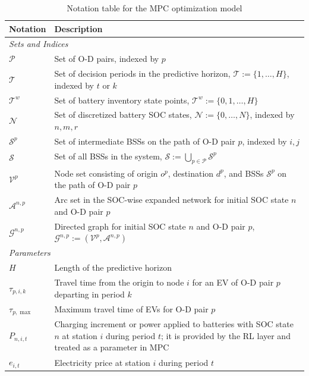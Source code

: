 \documentclass[12pt,hyperref,a4paper,UTF8]{ctexart}
\begin{document}
\begin{table}[!htbp]
  \centering
  \caption{Notation table for the MPC optimization model}
  \label{tab:notation}
  \footnotesize
  \setlength{\tabcolsep}{2pt}
  \renewcommand{\arraystretch}{0.88}
  \begin{tabular}{@{}lp{13cm}@{}}
    \toprule
    \textbf{Notation} & \textbf{Description} \\
    \midrule
    \multicolumn{2}{l}{\textit{Sets and Indices}} \\
    $\mathcal{P}$ & Set of O-D pairs, indexed by $p$ \\
    $\mathcal{T}$ & Set of decision periods in the predictive horizon, $\mathcal{T}:=\{1,\dots,H\}$, indexed by $t$ or $k$ \\
    $\mathcal{T}^{w}$ & Set of battery inventory state points, $\mathcal{T}^{w}:=\{0,1,\dots,H\}$ \\
    $\mathcal{N}$ & Set of discretized battery SOC states, $\mathcal{N}:=\{0,\dots,N\}$, indexed by $n,m,r$ \\
    $\mathcal{S}^{p}$ & Set of intermediate BSSs on the path of O-D pair $p$, indexed by $i,j$ \\
    $\mathcal{S}$ & Set of all BSSs in the system, $\mathcal{S}:=\bigcup_{p\in\mathcal{P}}\mathcal{S}^{p}$ \\
    $\mathcal{V}^{p}$ & Node set consisting of origin $o^{p}$, destination $d^{p}$, and BSSs $\mathcal{S}^{p}$ on the path of O-D pair $p$ \\
    $\mathcal{A}^{n,p}$ & Arc set in the SOC-wise expanded network for initial SOC state $n$ and O-D pair $p$ \\
    $\mathcal{G}^{n,p}$ & Directed graph for initial SOC state $n$ and O-D pair $p$, $\mathcal{G}^{n,p}:=(\mathcal{V}^{p},\mathcal{A}^{n,p})$ \\
    \midrule
    \multicolumn{2}{l}{\textit{Parameters}} \\
    $H$ & Length of the predictive horizon \\
    $\tau_{p,i,k}$ & Travel time from the origin to node $i$ for an EV of O-D pair $p$ departing in period $k$ \\
    $\tau_{p,\max}$ & Maximum travel time of EVs for O-D pair $p$ \\
    $P_{n,i,t}$ & Charging increment or power applied to batteries with SOC state $n$ at station $i$ during period $t$; it is provided by the RL layer and treated as a parameter in MPC \\
    $e_{i,t}$ & Electricity price at station $i$ during period $t$ \\

\end{tabular}
\end{table}
\end{document}
